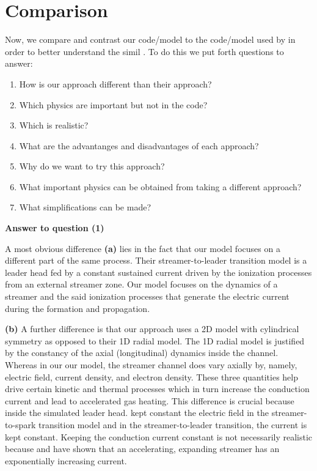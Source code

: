 \documentclass[]{article}
\begin{document}
	\section{Comparison}
	Now, we compare and contrast our code/model to the code/model used by \citet{daSilva:2013a} in order to better understand the simil . To do this we put forth questions to answer:
	\begin{enumerate}
		\item How is our approach different than their approach?
		\item Which physics are important but not in the code?
		\item Which is realistic?
		\item What are the advantanges and disadvantages of each approach?
		\item Why do we want to try this approach?
		\item What important physics can be obtained from taking a different approach?
		\item What simplifications can be made?
	\end{enumerate}

	\noindent \textbf{Answer to question (1)}

	 A most obvious difference \textbf{(a)} lies in the fact that our model focuses on a different part of the same process. Their streamer-to-leader transition model is a leader head fed by a constant sustained current driven by the ionization processes from an external streamer zone. Our model focuses on the dynamics of a streamer and the said ionization processes that generate the electric current during the formation and propagation.
	 
	 \textbf{(b)} A further difference is that our approach uses a 2D model with cylindrical symmetry as opposed to their 1D radial model. The 1D radial model is justified by the constancy of the axial (longitudinal) dynamics inside the channel. Whereas in our our model, the streamer channel does vary axially \citep{Shi:2016a} by, namely, electric field, current density, and electron density. These three quantities help drive certain kinetic and thermal processes which in turn increase the conduction current and lead to accelerated gas heating. This difference is crucial because inside the simulated leader head. \citet{daSilva:2013a} kept constant the electric field in the streamer-to-spark transition model and in the streamer-to-leader transition, the current is kept constant. Keeping the conduction current constant is not necessarily realistic because \citet{Liu:2010a} and \citet{Shi:2016a} have shown that an accelerating, expanding streamer has an exponentially increasing current.
	 
\end{document}
